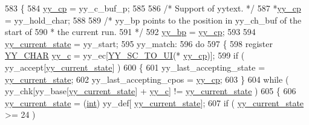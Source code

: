 \begin{DoxyCode}
583                 \{
584                 \mbox{\hyperlink{expr-lex_8cpp_aebf8322d98e81db5af081bb22a5f06fe}{yy\_cp}} = yy\_c\_buf\_p;
585 
586                 \textcolor{comment}{/* Support of yytext. */}
587                 *\mbox{\hyperlink{expr-lex_8cpp_aebf8322d98e81db5af081bb22a5f06fe}{yy\_cp}} = yy\_hold\_char;
588 
589                 \textcolor{comment}{/* yy\_bp points to the position in yy\_ch\_buf of the start of}
590 \textcolor{comment}{                 * the current run.}
591 \textcolor{comment}{                 */}
592                 \mbox{\hyperlink{expr-lex_8cpp_a71cf769ce518e8687bf8999b278c65f4}{yy\_bp}} = \mbox{\hyperlink{expr-lex_8cpp_aebf8322d98e81db5af081bb22a5f06fe}{yy\_cp}};
593 
594                 \mbox{\hyperlink{expr-lex_8cpp_abb8b9672f94e21056888ae611b41cd1b}{yy\_current\_state}} = yy\_start;
595 yy\_match:
596                 \textcolor{keywordflow}{do}
597                         \{
598                         \textcolor{keyword}{register} \mbox{\hyperlink{expr-lex_8cpp_a1f324b3cb0839eeb90145f0274e6946e}{YY\_CHAR}} \mbox{\hyperlink{expr-lex_8cpp_a2ce7598a28e3deb63b5ef934b031a93f}{yy\_c}} = yy\_ec[\mbox{\hyperlink{expr-lex_8cpp_af1185350b7a92cf8aa5324c68850c8a6}{YY\_SC\_TO\_UI}}(*
      \mbox{\hyperlink{expr-lex_8cpp_aebf8322d98e81db5af081bb22a5f06fe}{yy\_cp}})];
599                         \textcolor{keywordflow}{if} ( yy\_accept[\mbox{\hyperlink{expr-lex_8cpp_abb8b9672f94e21056888ae611b41cd1b}{yy\_current\_state}}] )
600                                 \{
601                                 yy\_last\_accepting\_state = \mbox{\hyperlink{expr-lex_8cpp_abb8b9672f94e21056888ae611b41cd1b}{yy\_current\_state}};
602                                 yy\_last\_accepting\_cpos = \mbox{\hyperlink{expr-lex_8cpp_aebf8322d98e81db5af081bb22a5f06fe}{yy\_cp}};
603                                 \}
604                         \textcolor{keywordflow}{while} ( yy\_chk[yy\_base[\mbox{\hyperlink{expr-lex_8cpp_abb8b9672f94e21056888ae611b41cd1b}{yy\_current\_state}}] + 
      \mbox{\hyperlink{expr-lex_8cpp_a2ce7598a28e3deb63b5ef934b031a93f}{yy\_c}}] != \mbox{\hyperlink{expr-lex_8cpp_abb8b9672f94e21056888ae611b41cd1b}{yy\_current\_state}} )
605                                 \{
606                                 \mbox{\hyperlink{expr-lex_8cpp_abb8b9672f94e21056888ae611b41cd1b}{yy\_current\_state}} = (\mbox{\hyperlink{_util_8cpp_a0ef32aa8672df19503a49fab2d0c8071}{int}}) yy\_def[
      \mbox{\hyperlink{expr-lex_8cpp_abb8b9672f94e21056888ae611b41cd1b}{yy\_current\_state}}];
607                                 \textcolor{keywordflow}{if} ( \mbox{\hyperlink{expr-lex_8cpp_abb8b9672f94e21056888ae611b41cd1b}{yy\_current\_state}} >= 24 )

\end{DoxyCode}
